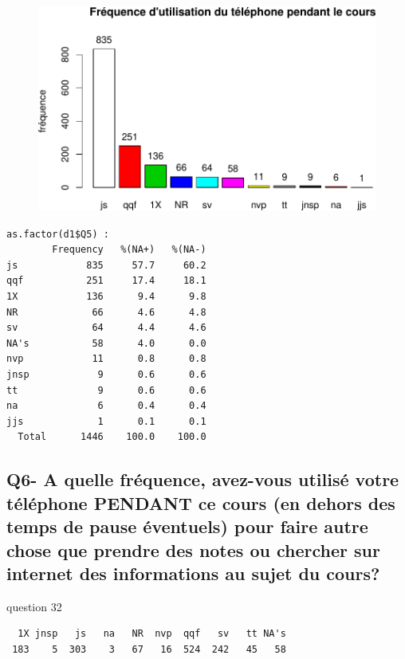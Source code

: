 \documentclass[]{article}
\begin{document}
\begin{figure}[htbp]
\centering
\includegraphics{qs_etudiants_files/figure-latex/utilisation-1.pdf}
\end{figure}

\begin{verbatim}
as.factor(d1$Q5) : 
        Frequency   %(NA+)   %(NA-)
js            835     57.7     60.2
qqf           251     17.4     18.1
1X            136      9.4      9.8
NR             66      4.6      4.8
sv             64      4.4      4.6
NA's           58      4.0      0.0
nvp            11      0.8      0.8
jnsp            9      0.6      0.6
tt              9      0.6      0.6
na              6      0.4      0.4
jjs             1      0.1      0.1
  Total      1446    100.0    100.0
\end{verbatim}

\subsection{Q6- A quelle fréquence, avez-vous utilisé votre téléphone
PENDANT ce cours (en dehors des temps de pause éventuels) pour faire
autre chose que prendre des notes ou chercher sur internet des
informations au sujet du
cours?}\label{q6--a-quelle-frequence-avez-vous-utilise-votre-telephone-pendant-ce-cours-en-dehors-des-temps-de-pause-eventuels-pour-faire-autre-chose-que-prendre-des-notes-ou-chercher-sur-internet-des-informations-au-sujet-du-cours}

question 32

\begin{verbatim}
  1X jnsp   js   na   NR  nvp  qqf   sv   tt NA's 
 183    5  303    3   67   16  524  242   45   58 
\end{verbatim}
\end{document}
